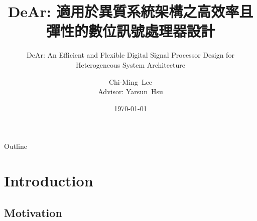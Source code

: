 \documentclass{beamer}
\author[Chi-Ming~Lee]{ 
    Chi-Ming~Lee\\{\small Advisor: Yarsun~Hsu}
}
\institute[NTHU EE] %
{
    Department of Electrial Engineering\\
    National Tsing Hua University
}
\date{\today}
\begin{document}
\begin{CJK}{UTF8}{bkai}

    \title[DeAr DSP]{ DeAr: 適用於異質系統架構之高效率且彈性的數位訊號處理器設計}
    \subtitle{DeAr: An Efficient and Flexible Digital Signal Processor Design for Heterogeneous System Architecture}

    \begin{frame}
        \titlepage
    \end{frame}

    \begin{frame}{Outline}
        \tableofcontents
    \end{frame}


    \section{Introduction}

    \subsection{Motivation}


\end{CJK}
\end{document}
